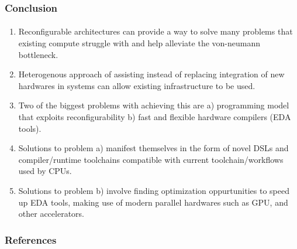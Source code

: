 \documentclass{beamer}
\begin{document}
{\begin{frame}[fragile]
  \frametitle{Conclusion}
  \framesubtitle{}

  \begin{enumerate}
    \item Reconfigurable architectures can provide a way to solve many problems
      that existing compute struggle with and help alleviate the von-neumann
      bottleneck.
    \item Heterogenous approach of assisting instead of replacing integration of
      new hardwares in systems can allow existing infrastructure to be used.
    \item Two of the biggest problems with achieving this are a) programming
      model that exploits reconfigurability b) fast and flexible hardware
      compilers (EDA tools).
    \item Solutions to problem a) manifest themselves in the form of novel DSLs
      and compiler/runtime toolchains compatible with current
      toolchain/workflows used by CPUs.
    \item Solutions to problem b) involve finding optimization oppurtunities
      to speed up EDA tools, making use of modern parallel hardwares such as
      GPU, and other accelerators.
  \end{enumerate}
\end{frame}

\begin{frame}[allowframebreaks]
\frametitle{References}
\printbibliography
\end{frame}

}
\end{document}
